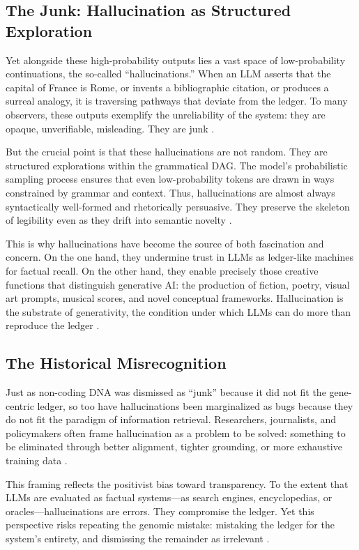 \documentclass[11pt]{article}
\begin{document}
\subsection{The Junk: Hallucination as Structured Exploration}
Yet alongside these high-probability outputs lies a vast space of low-probability continuations, the so-called ``hallucinations.'' When an LLM asserts that the capital of France is Rome, or invents a bibliographic citation, or produces a surreal analogy, it is traversing pathways that deviate from the ledger. To many observers, these outputs exemplify the unreliability of the system: they are opaque, unverifiable, misleading. They are junk \citep{bender2021}.

But the crucial point is that these hallucinations are not random. They are structured explorations within the grammatical DAG. The model’s probabilistic sampling process ensures that even low-probability tokens are drawn in ways constrained by grammar and context. Thus, hallucinations are almost always syntactically well-formed and rhetorically persuasive. They preserve the skeleton of legibility even as they drift into semantic novelty \citep{shanahan2023}.

This is why hallucinations have become the source of both fascination and concern. On the one hand, they undermine trust in LLMs as ledger-like machines for factual recall. On the other hand, they enable precisely those creative functions that distinguish generative AI: the production of fiction, poetry, visual art prompts, musical scores, and novel conceptual frameworks. Hallucination is the substrate of generativity, the condition under which LLMs can do more than reproduce the ledger \citep{hofstadter1995}.

\subsection{The Historical Misrecognition}
Just as non-coding DNA was dismissed as ``junk'' because it did not fit the gene-centric ledger, so too have hallucinations been marginalized as bugs because they do not fit the paradigm of information retrieval. Researchers, journalists, and policymakers often frame hallucination as a problem to be solved: something to be eliminated through better alignment, tighter grounding, or more exhaustive training data \citep{bender2021, marcus2022}.

This framing reflects the positivist bias toward transparency. To the extent that LLMs are evaluated as factual systems---as search engines, encyclopedias, or oracles---hallucinations are errors. They compromise the ledger. Yet this perspective risks repeating the genomic mistake: mistaking the ledger for the system’s entirety, and dismissing the remainder as irrelevant \citep{keller2000}.
\end{document}
